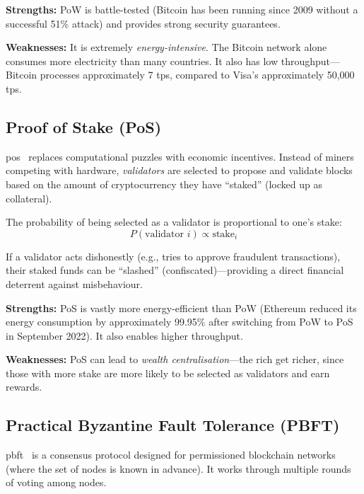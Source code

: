 \textbf{Strengths:} PoW is battle-tested (Bitcoin has been running since 2009 without a successful 51\% attack) and provides strong security guarantees.

\textbf{Weaknesses:} It is extremely \emph{energy-intensive}. The Bitcoin network alone consumes more electricity than many countries. It also has low throughput---Bitcoin processes approximately 7 \gls{tps}, compared to Visa's approximately 50,000 \gls{tps}.

\subsection{Proof of Stake (PoS)}
\label{sec:pos}

\Gls{pos}~\cite{king2012ppcoin} replaces computational puzzles with economic incentives. Instead of miners competing with hardware, \emph{validators} are selected to propose and validate blocks based on the amount of cryptocurrency they have ``staked'' (locked up as collateral).

The probability of being selected as a validator is proportional to one's stake:
\begin{equation}
    P(\text{validator } i) \propto \text{stake}_i
    \label{eq:pos}
\end{equation}

If a validator acts dishonestly (e.g., tries to approve fraudulent transactions), their staked funds can be ``slashed'' (confiscated)---providing a direct financial deterrent against misbehaviour.

\textbf{Strengths:} PoS is vastly more energy-efficient than PoW (Ethereum reduced its energy consumption by approximately 99.95\% after switching from PoW to PoS in September 2022). It also enables higher throughput.

\textbf{Weaknesses:} PoS can lead to \emph{wealth centralisation}---the rich get richer, since those with more stake are more likely to be selected as validators and earn rewards.

\subsection{Practical Byzantine Fault Tolerance (PBFT)}
\label{sec:pbft}

\Gls{pbft}~\cite{castro1999pbft} is a consensus protocol designed for permissioned blockchain networks (where the set of nodes is known in advance). It works through multiple rounds of voting among nodes.

